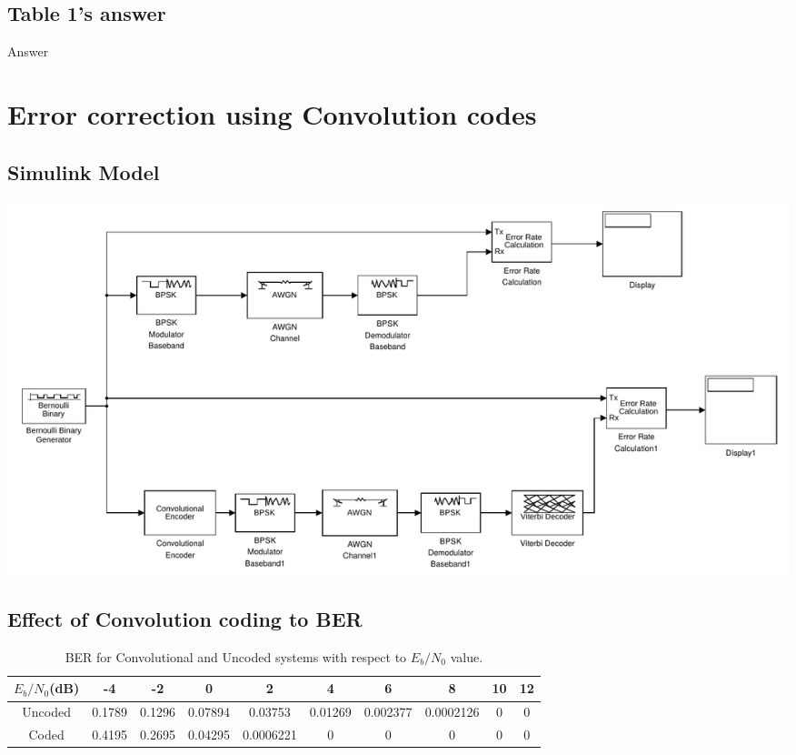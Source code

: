 \documentclass[11pt]{article}
\newcommand{\snr}{$E_{b}/N_{0}$}
\begin{document}
\subsection{Table 1's answer}
Answer


\section{Error correction using Convolution codes}
\subsection{Simulink Model}
\begin{center}
    \includegraphics[width=.8\textwidth]{q6-model.pdf}
    \label{fig:q6-model}
\end{center}

\subsection{Effect of Convolution coding to BER}
\begin{table}[h]
    \centering
    \caption{\label{tab:transmit_power_levels_sim}BER for Convolutional and Uncoded systems with respect to $E_{b}/N_{0}$ value.}
    \begin{tabular}{|c|c|c|c|c|c|c|c|c|c|}
        \hline
        \snr (dB) & -4       & -2       & 0         & 2         & 4       & 6        & 8         & 10 & 12 \\\hline
        Uncoded   & 0.1789   & 0.1296   & 0.07894   & 0.03753   & 0.01269 & 0.002377 & 0.0002126 & 0  & 0 \\\hline
        Coded     & 0.4195   & 0.2695   & 0.04295   & 0.0006221 & 0       & 0        & 0         & 0  & 0 \\\hline
    \end{tabular}
\end{table}
\end{document}
